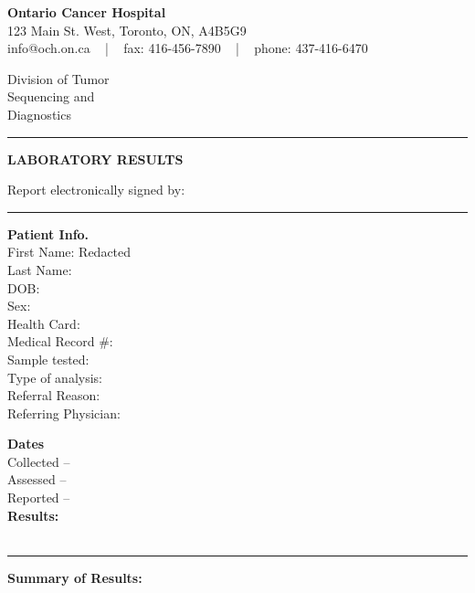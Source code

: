 \documentclass[11pt]{extarticle}
\newcommand{\data}[1]{}
\begin{document}
\parbox[b]{0.65\textwidth}{%
  \textbf{\LARGE Ontario Cancer Hospital} \\[0.5em]
  \large 123 Main St. West, Toronto, ON, A4B5G9 \\[0.5em]
  info@och.on.ca ~ | ~ fax: 416-456-7890 ~ | ~ phone: 437-416-6470
}
\hfill
\parbox[b]{0.3\textwidth}{%
  \raggedleft
  \large Division of Tumor \\ 
  Sequencing and \\ 
  Diagnostics
}
\vspace{2em}
\hrule


\begin{center}
{\Huge \bf LABORATORY RESULTS}
\end{center}
\noindent Report electronically signed by:
\noindent\hrulefill
\vspace{0.5em}
\hrule
\vspace{1.5em}



\parbox[b]{0.60\textwidth}{
  \textbf{\Large Patient Info.} \\[0.5em]
  First Name: Redacted \\
  Last Name: \\
  DOB: \\
  Sex: \\
  Health Card: \\
  Medical Record \#: \\
  Sample tested: \data{sample_type} \\
  Type of analysis: \data{analysis_type} \\
  Referral Reason: \data{testing_context} \\
  Referring Physician:
}

\parbox[b]{0.3\textwidth}{
  \textbf{\Large Dates} \\[0.5em]
  Collected – \data{date_collected} \\
  Assessed – \data{date_received} \\
  Reported – \data{date_verified} \\[1em]
  \textbf{\Large Results:} \\[0.5em]
  \data{summary_blurb} \\
}


\vspace{2em}
\hrule

{\bf \Huge Summary of Results:}

\vspace{1em}
\end{document}
